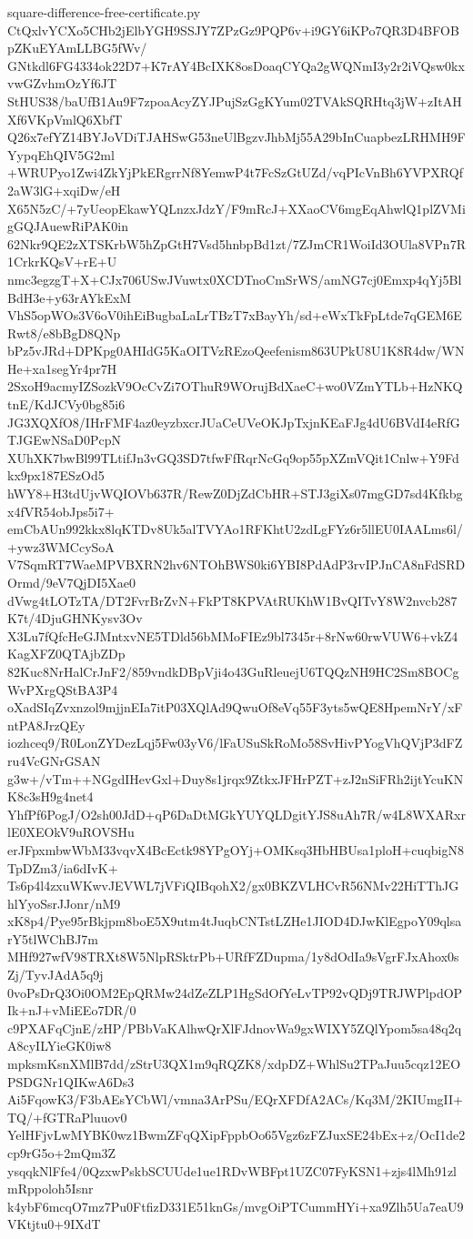 \documentclass[11pt]{article}
\theoremstyle{definition}
\theoremstyle{remark}
\begin{document}
\begin{filecontents*}[overwrite]{square-difference-free-certificate.py}
CtQxlvYCXo5CHb2jElbYGH9SSJY7ZPzGz9PQP6v+i9GY6iKPo7QR3D4BFOBpZKuEYAmLLBG5fWv/
GNtkdl6FG4334ok22D7+K7rAY4BcIXK8osDoaqCYQa2gWQNmI3y2r2iVQsw0kxvwGZvhmOzYf6JT
StHUS38/baUfB1Au9F7zpoaAcyZYJPujSzGgKYum02TVAkSQRHtq3jW+zItAHXf6VKpVmlQ6XbfT
Q26x7efYZ14BYJoVDiTJAHSwG53neUlBgzvJhbMj55A29bInCuapbezLRHMH9FYypqEhQIV5G2ml
+WRUPyo1Zwi4ZkYjPkERgrrNf8YemwP4t7FcSzGtUZd/vqPIcVnBh6YVPXRQf2aW3lG+xqiDw/eH
X65N5zC/+7yUeopEkawYQLnzxJdzY/F9mRcJ+XXaoCV6mgEqAhwlQ1plZVMigGQJAuewRiPAK0in
62Nkr9QE2zXTSKrbW5hZpGtH7Vsd5hnbpBd1zt/7ZJmCR1WoiId3OUla8VPn7R1CrkrKQsV+rE+U
nmc3egzgT+X+CJx706USwJVuwtx0XCDTnoCmSrWS/amNG7cj0Emxp4qYj5BlBdH3e+y63rAYkExM
VhS5opWOs3V6oV0ihEiBugbaLaLrTBzT7xBayYh/sd+eWxTkFpLtde7qGEM6ERwt8/e8bBgD8QNp
bPz5vJRd+DPKpg0AHIdG5KaOITVzREzoQeefenism863UPkU8U1K8R4dw/WNHe+xa1segYr4pr7H
2SxoH9acmyIZSozkV9OcCvZi7OThuR9WOrujBdXaeC+wo0VZmYTLb+HzNKQtnE/KdJCVy0bg85i6
JG3XQXfO8/IHrFMF4az0eyzbxcrJUaCeUVeOKJpTxjnKEaFJg4dU6BVdI4eRfGTJGEwNSaD0PcpN
XUhXK7bwBl99TLtifJn3vGQ3SD7tfwFfRqrNcGq9op55pXZmVQit1Cnlw+Y9Fdkx9px187ESzOd5
hWY8+H3tdUjvWQIOVb637R/RewZ0DjZdCbHR+STJ3giXs07mgGD7sd4Kfkbgx4fVR54obJps5i7+
emCbAUn992kkx8lqKTDv8Uk5alTVYAo1RFKhtU2zdLgFYz6r5llEU0IAALms6l/+ywz3WMCcySoA
V7SqmRT7WaeMPVBXRN2hv6NTOhBWS0ki6YBI8PdAdP3rvIPJnCA8nFdSRDOrmd/9eV7QjDI5Xae0
dVwg4tLOTzTA/DT2FvrBrZvN+FkPT8KPVAtRUKhW1BvQITvY8W2nvcb287K7t/4DjuGHNKysv3Ov
X3Lu7fQfcHeGJMntxvNE5TDld56bMMoFIEz9bl7345r+8rNw60rwVUW6+vkZ4KagXFZ0QTAjbZDp
82Kuc8NrHalCrJnF2/859vndkDBpVji4o43GuRleuejU6TQQzNH9HC2Sm8BOCgWvPXrgQStBA3P4
oXadSIqZvxnzol9mjjnEIa7itP03XQlAd9QwuOf8eVq55F3yts5wQE8HpemNrY/xFntPA8JrzQEy
iozhceq9/R0LonZYDezLqj5Fw03yV6/lFaUSuSkRoMo58SvHivPYogVhQVjP3dFZru4VcGNrGSAN
g3w+/vTm++NGgdIHevGxl+Duy8s1jrqx9ZtkxJFHrPZT+zJ2nSiFRh2ijtYcuKNK8c3sH9g4net4
YhfPf6PogJ/O2sh00JdD+qP6DaDtMGkYUYQLDgitYJS8uAh7R/w4L8WXARxrlE0XEOkV9uROVSHu
erJFpxmbwWbM33vqvX4BcEctk98YPgOYj+OMKsq3HbHBUsa1ploH+cuqbigN8TpDZm3/ia6dIvK+
Ts6p4l4zxuWKwvJEVWL7jVFiQIBqohX2/gx0BKZVLHCvR56NMv22HiTThJGhlYyoSsrJJonr/nM9
xK8p4/Pye95rBkjpm8boE5X9utm4tJuqbCNTstLZHe1JIOD4DJwKlEgpoY09qlsarY5tlWChBJ7m
MHf927wfV98TRXt8W5NlpRSktrPb+URfFZDupma/1y8dOdIa9sVgrFJxAhox0sZj/TyvJAdA5q9j
0voPsDrQ3Oi0OM2EpQRMw24dZeZLP1HgSdOfYeLvTP92vQDj9TRJWPlpdOPIk+nJ+vMiEEo7DR/0
c9PXAFqCjnE/zHP/PBbVaKAlhwQrXlFJdnovWa9gxWIXY5ZQlYpom5sa48q2qA8cyILYieGK0iw8
mpksmKsnXMlB7dd/zStrU3QX1m9qRQZK8/xdpDZ+WhlSu2TPaJuu5cqz12EOPSDGNr1QIKwA6Ds3
Ai5FqowK3/F3bAEsYCbWl/vmna3ArPSu/EQrXFDfA2ACs/Kq3M/2KIUmgII+TQ/+fGTRaPluuov0
YelHFjvLwMYBK0wz1BwmZFqQXipFppbOo65Vgz6zFZJuxSE24bEx+z/OcI1de2cp9rG5o+2mQm3Z
ysqqkNlFfe4/0QzxwPskbSCUUde1ue1RDvWBFpt1UZC07FyKSN1+zjs4lMh91zlmRppoloh5Isnr
k4ybF6mcqO7mz7Pu0FtfizD331E51knGs/mvgOiPTCummHYi+xa9Zlh5Ua7eaU9VKtjtu0+9IXdT

\end{filecontents*}
\end{document}
